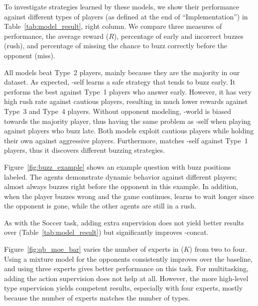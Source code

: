To investigate strategies learned by
these models, we show their performance against different types of players (as
defined at the end of ``Implementation'') in Table~\ref{tab:model_result}, right
column.  We compare three measures of
performance, the average reward ($R$), percentage of early and incorrect buzzes
(rush), and percentage of missing the chance to buzz correctly before the
opponent (miss).


All models beat Type~2 players, mainly
because they are the majority in our dataset.  As expected, \dqn{}-self learns a
safe strategy that tends to buzz early.  It performs the best against Type~1
players who answer early.  However, it has very high rush rate against cautious
players, resulting in much lower rewards against Type~3 and Type~4 players.  Without
opponent modeling, \dqn{}-world is biased towards the majority player, thus having
the same problem as \dqn{}-self when playing against players who buzz late.  Both
\dron{} models exploit cautious players while
holding their own against aggressive players.
Furthermore, \dronmoe{} matches \dqn{}-self against Type~1 players,
thus it discovers different buzzing strategies.

Figure~\ref{fig:buzz_example} shows an example question with buzz positions labeled.
The \dron{} agents demonstrate dynamic behavior against different players;
\dronmoe{} almost always buzzes right before the opponent in this example.
In addition, when the player buzzes wrong and the game continues, \dronmoe{} learns to wait longer since the opponent is gone, while the other agents are still in a rush.

As with the Soccer task,
adding extra supervision does not yield better results over \dronmoe{}
(Table~\ref{tab:model_result}) but significantly improves
\dron{}-concat.




Figure~\ref{fig:qb_moe_bar} varies the number of experts in \dronmoe{}
($K$) from two to four.  Using a mixture model for the opponents
consistently improves over the \dqn{} baseline, and using three
experts gives better performance on this task.  For multitasking,
adding the action supervision does not help at all.  However, the more
high-level type supervision yields competent results, especially with
four experts, mostly because the number of experts matches the
number of types.

